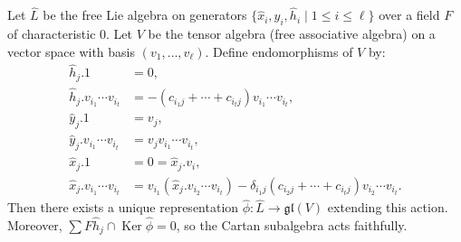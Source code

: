 Let $\hat{L}$ be the free Lie algebra on generators $\{\hat{x}_i, \hat{y}_i, \hat{h}_i \mid 1 \leq i \leq \ell\}$ over a field $F$ of characteristic $0$. Let $V$ be the tensor algebra (free associative algebra) on a vector space with basis $(v_1, \ldots, v_\ell)$. Define endomorphisms of $V$ by:
\begin{align*}
\hat{h}_j.1 &= 0,\\
\hat{h}_j.v_{i_1} \cdots v_{i_t} &= -(c_{i_1 j} + \cdots + c_{i_t j}) v_{i_1} \cdots v_{i_t},\\
\hat{y}_j.1 &= v_j,\\
\hat{y}_j.v_{i_1} \cdots v_{i_t} &= v_j v_{i_1} \cdots v_{i_t},\\
\hat{x}_j.1 &= 0 = \hat{x}_j.v_i,\\
\hat{x}_j.v_{i_1} \cdots v_{i_t} &= v_{i_1}(\hat{x}_j.v_{i_2} \cdots v_{i_t}) - \delta_{i_1 j}(c_{i_2 j} + \cdots + c_{i_t j}) v_{i_2} \cdots v_{i_t}.
\end{align*}
Then there exists a unique representation $\hat{\phi}: \hat{L} \to \mathfrak{gl}(V)$ extending this action. Moreover, $\sum F \hat{h}_j \cap \operatorname{Ker} \hat{\phi} = 0$, so the Cartan subalgebra acts faithfully.
